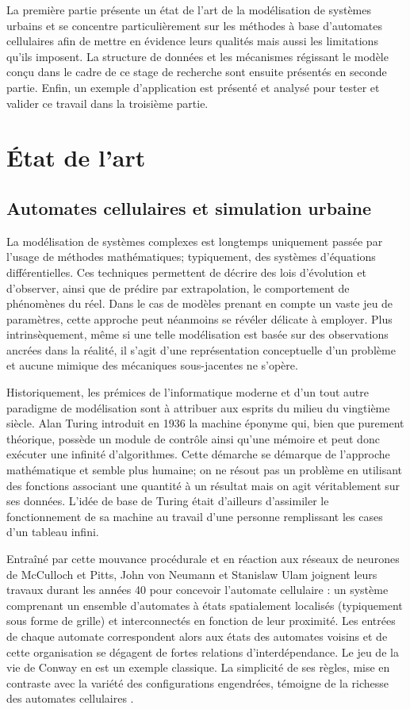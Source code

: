 \documentclass[10pt]{article}
\begin{document}
La première partie présente un état de l'art de la modélisation de
systèmes urbains et se concentre particulièrement sur les méthodes à
base d'automates cellulaires afin de mettre en évidence leurs qualités
mais aussi les limitations qu'ils imposent. La structure de données et
les mécanismes régissant le modèle conçu dans le cadre de ce stage de
recherche sont ensuite présentés en seconde partie. Enfin, un exemple
d'application est présenté et analysé pour tester et valider ce
travail dans la troisième partie.

\section{\'Etat de l'art}

\subsection{Automates cellulaires et simulation urbaine}

La modélisation de systèmes complexes est longtemps uniquement passée
par l'usage de méthodes mathématiques; typiquement, des systèmes
d'équations différentielles. Ces techniques permettent de décrire des
lois d'évolution et d'observer, ainsi que de prédire par
extrapolation, le comportement de phénomènes du réel. Dans le cas de
modèles prenant en compte un vaste jeu de paramètres, cette approche
peut néanmoins se révéler délicate à employer. Plus intrinsèquement,
même si une telle modélisation est basée sur des observations ancrées
dans la réalité, il s'agit d'une représentation conceptuelle d'un
problème et aucune mimique des mécaniques sous-jacentes ne s'opère.

Historiquement, les prémices de l'informatique moderne et d'un tout
autre paradigme de modélisation sont à attribuer aux esprits du milieu
du vingtième siècle. Alan Turing introduit en 1936 la machine éponyme
qui, bien que purement théorique, possède un module de contrôle ainsi
qu'une mémoire et peut donc exécuter une infinité d'algorithmes. Cette
démarche se démarque de l'approche mathématique et semble plus
humaine; on ne résout pas un problème en utilisant des fonctions
associant une quantité à un résultat mais on agit véritablement sur
ses données. L'idée de base de Turing était d'ailleurs d'assimiler le
fonctionnement de sa machine au travail d'une personne remplissant les
cases d'un tableau infini.

Entraîné par cette mouvance procédurale et en réaction aux réseaux de
neurones de McCulloch et Pitts, John von Neumann et Stanislaw Ulam
joignent leurs travaux durant les années 40 pour concevoir l'automate
cellulaire : un système comprenant un ensemble d'automates à états
spatialement localisés (typiquement sous forme de grille) et
interconnectés en fonction de leur proximité. Les entrées de chaque
automate correspondent alors aux états des automates voisins et de
cette organisation se dégagent de fortes relations
d'interdépendance. Le jeu de la vie de Conway en est un exemple
classique. La simplicité de ses règles, mise en contraste avec la
variété des configurations engendrées, témoigne de la richesse des
automates cellulaires \cite{Gardner1970}.
\end{document}
